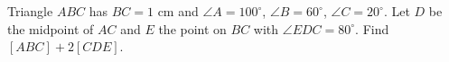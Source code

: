 Triangle $ABC$ has $BC=1$ cm and $\angle A=100^\circ$, $\angle B=60^\circ$, $\angle C=20^\circ$. Let $D$ be the midpoint of $AC$ and $E$ the point on $BC$ with $\angle EDC=80^\circ$. Find $[ABC]+2[CDE]$.
